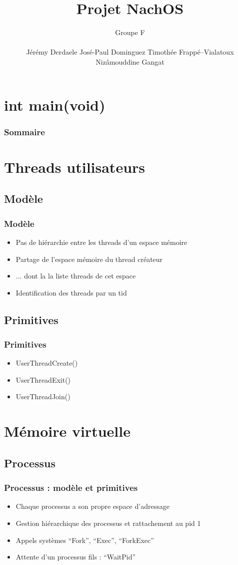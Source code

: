 \documentclass{beamer}
\title{Projet NachOS}
\author{
  Groupe F \newline{}
  {\rule{5cm}{0.4pt}}\newline{}
  Jérémy Derdaele\newline{}
  José-Paul Dominguez\newline{}
  Timothée Frappé--Vialatoux\newline{}
  Nizâmouddine Gangat\newline{}
  {\rule{5cm}{0.4pt}}\newline{}
}
\begin{document}
\begin{frame}
  \titlepage
\end{frame}

\section*{int main(void)}
\begin{frame}
  \frametitle{Sommaire}
  \tableofcontents
\end{frame}

\section{Threads utilisateurs}
\subsection{Modèle}
\begin{frame}
  \frametitle{Modèle}
  \begin{itemize}
  \item Pas de hiérarchie entre les threads d'un espace mémoire
  \item Partage de l'espace mémoire du thread créateur
  \item ... dont la la liste threads de cet espace
  \item Identification des threads par un tid
  \end{itemize}
\end{frame}

\subsection{Primitives}
\begin{frame}
  \frametitle{Primitives}
  \begin{itemize}
    \item UserThreadCreate()
    \item UserThreadExit()
    \item UserThreadJoin()
  \end{itemize}
\end{frame}

\section{Mémoire virtuelle}
\subsection{Processus}
\begin{frame}
  \frametitle{Processus : modèle et primitives}
  \begin{itemize}
  \item Chaque processus a son propre espace d'adressage
  \item Gestion hiérarchique des processus et rattachement au pid 1
  \item Appels systèmes ``Fork'', ``Exec'', ``ForkExec''
  \item Attente d'un processus fils : ``WaitPid''
  \end{itemize}
\end{frame}
\end{document}
